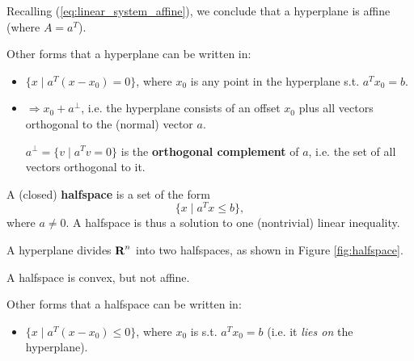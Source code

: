 \begin{Fact}
  Recalling (\ref{eq:linear_system_affine}), we conclude that a hyperplane is
  affine (where $A=a^T$).
\end{Fact}

Other forms that a hyperplane can be written in:

\begin{itemize}
\item $\{ x \mid a^T(x-x_0)=0 \}$, where $x_0$ is any point in the hyperplane
  s.t. $a^Tx_0=b$.
\item $\Rightarrow x_0+a^\perp$, i.e. the hyperplane consists of an offset $x_0$
  plus all vectors orthogonal to the (normal) vector $a$.
  \begin{Definition}
    $a^\perp=\{v \mid a^Tv=0\}$ is the \textbf{orthogonal
      complement} of $a$, i.e. the set of all vectors orthogonal to it.
  \end{Definition}
\end{itemize}

\begin{Definition}
  A (closed) \textbf{halfspace} is a set of the form
  \begin{equation*}
    \{ x \mid a^Tx \le b \},
  \end{equation*}
  where $a\ne 0$. A halfspace is thus a solution to one (nontrivial) linear
  inequality.

\end{Definition}

\begin{Fact}
  A hyperplane divides $\textbf{R}^n$ into two halfspaces, as shown in Figure \ref{fig:halfspace}.
\end{Fact}

\begin{Fact}
  A halfspace is convex, but not affine.
\end{Fact}

Other forms that a halfspace can be written in:

\begin{itemize}
\item $\{ x \mid a^T(x-x_0)\le 0 \}$, where $x_0$ is s.t. $a^Tx_0=b$ (i.e. it
  \textit{lies on} the hyperplane).

\end{itemize}

